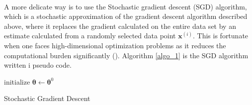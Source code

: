 \\
A more delicate way is to use the Stochastic gradient descent (SGD) algorithm, which is a stochastic approximation of the gradient descent algorithm described above, where it replaces the gradient calculated on the entire data set by an estimate calculated from a randomly selected data point $\boldsymbol{x}^{(i)}$. This is fortunate when one faces high-dimensional optimization problems as it reduces the computational burden significantly (\cite{bottou2008tradeoffs}). Algorithm \ref{algo_1} is the SGD algorithm written i pseudo code.\\
\begin{algorithm}[H]\label{algo_1}
\SetAlgoLined
{}
 initialize $\boldsymbol{\theta}\leftarrow \boldsymbol{\theta}^0$\;
 \caption{Stochastic Gradient Descent}
\end{algorithm}







